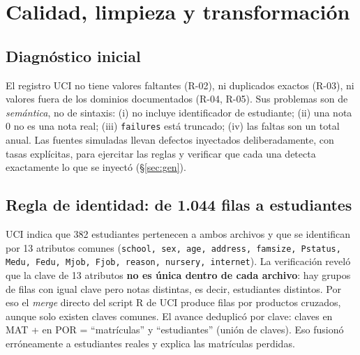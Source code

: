 \documentclass[11pt,a4paper]{article}
\begin{document}
\section{Calidad, limpieza y transformación}
\subsection{Diagnóstico inicial}
El registro UCI no tiene valores faltantes (R-02), ni duplicados exactos (R-03), ni valores fuera
de los dominios documentados (R-04, R-05). Sus problemas son de \emph{semántica}, no de sintaxis:
(i) no incluye identificador de estudiante; (ii) una nota 0 no es una nota real; (iii)
\texttt{failures} está truncado; (iv) las faltas son un total anual. Las fuentes simuladas llevan
defectos inyectados deliberadamente, con tasas explícitas, para ejercitar las reglas y verificar que
cada una detecta exactamente lo que se inyectó (§\ref{sec:gen}).

\subsection{Regla de identidad: de 1.044 filas a \nEst{} estudiantes}
UCI indica que 382 estudiantes pertenecen a ambos archivos y que se identifican por 13 atributos
comunes (\texttt{school, sex, age, address, famsize, Pstatus, Medu, Fedu, Mjob, Fjob, reason,
nursery, internet}). La verificación reveló que la clave de 13 atributos \textbf{no es única dentro
de cada archivo}: hay \nGruposRep{} grupos de filas con igual clave pero notas distintas, es decir, estudiantes
distintos. Por eso el \emph{merge} directo del script R de UCI produce \nMergeIngenuo{} filas por
productos cruzados, aunque solo existen \nClavesComunes{} claves comunes. El avance deduplicó por clave: \nClavesMat{} claves en MAT + \nClavesPor{} en POR = \nMatAvance{} “matrículas” y \nClavesUnion{} “estudiantes” (unión de claves). Eso fusionó erróneamente a \nPerdidasFusion{} estudiantes reales y explica las \nPerdidasFusion{} matrículas perdidas.
\end{document}
